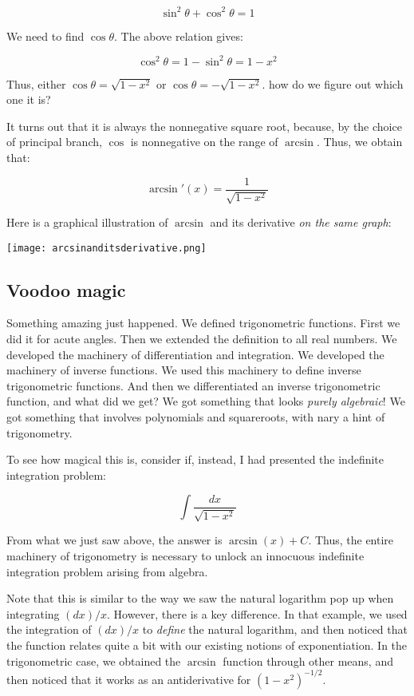 \documentclass{amsart}
\begin{document}
$$\sin^2 \theta + \cos^2 \theta = 1$$

We need to find $\cos \theta$. The above relation gives:

$$\cos^2 \theta = 1 - \sin^2 \theta = 1 - x^2$$

Thus, either $\cos \theta = \sqrt{1 - x^2}$ or $\cos \theta = -\sqrt{1
- x^2}$. how do we figure out which one it is?

It turns out that it is always the nonnegative square root, because, by
the choice of principal branch, $\cos$ is nonnegative on the range of
$\arcsin$. Thus, we obtain that:

$$\arcsin'(x) = \frac{1}{\sqrt{1 - x^2}}$$

Here is a graphical illustration of $\arcsin$ and its derivative {\em
on the same graph}:

\texttt{[image: arcsinanditsderivative.png]}
\subsection{Voodoo magic}

Something amazing just happened. We defined trigonometric
functions. First we did it for acute angles. Then we extended the
definition to all real numbers. We developed the machinery of
differentiation and integration. We developed the machinery of inverse
functions. We used this machinery to define inverse trigonometric
functions. And then we differentiated an inverse trigonometric
function, and what did we get? We got something that looks {\em purely
algebraic}! We got something that involves polynomials and
squareroots, with nary a hint of trigonometry.

To see how magical this is, consider if, instead, I had presented the
indefinite integration problem:

$$\int \frac{dx}{\sqrt{1 - x^2}}$$

From what we just saw above, the answer is $\arcsin(x) + C$. Thus, the
entire machinery of trigonometry is necessary to unlock an innocuous
indefinite integration problem arising from algebra.

Note that this is similar to the way we saw the natural logarithm pop
up when integrating $(dx)/x$. However, there is a key difference. In
that example, we used the integration of $(dx)/x$ to {\em define} the
natural logarithm, and then noticed that the function relates quite a
bit with our existing notions of exponentiation. In the trigonometric
case, we obtained the $\arcsin$ function through other means, and then
noticed that it works as an antiderivative for $(1 - x^2)^{-1/2}$.
\end{document}
